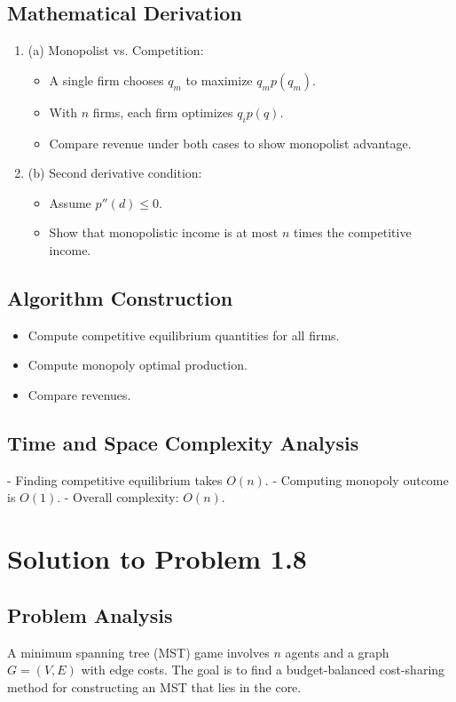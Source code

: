 \documentclass{article}
\begin{document}
\subsection*{Mathematical Derivation}
\begin{enumerate}
    \item (a) Monopolist vs. Competition:
    \begin{itemize}
        \item A single firm chooses $q_m$ to maximize $q_m p(q_m)$.
        \item With $n$ firms, each firm optimizes $q_i p(q)$.
        \item Compare revenue under both cases to show monopolist advantage.
    \end{itemize}
    \item (b) Second derivative condition:
    \begin{itemize}
        \item Assume $p''(d) \leq 0$.
        \item Show that monopolistic income is at most $n$ times the competitive income.
    \end{itemize}
\end{enumerate}

\subsection*{Algorithm Construction}
\begin{itemize}
    \item Compute competitive equilibrium quantities for all firms.
    \item Compute monopoly optimal production.
    \item Compare revenues.
\end{itemize}

\subsection*{Time and Space Complexity Analysis}
- Finding competitive equilibrium takes $O(n)$.
- Computing monopoly outcome is $O(1)$.
- Overall complexity: $O(n)$.

\section*{Solution to Problem 1.8}

\subsection*{Problem Analysis}
A minimum spanning tree (MST) game involves $n$ agents and a graph $G = (V, E)$ with edge costs. The goal is to find a budget-balanced cost-sharing method for constructing an MST that lies in the core.
\end{document}
